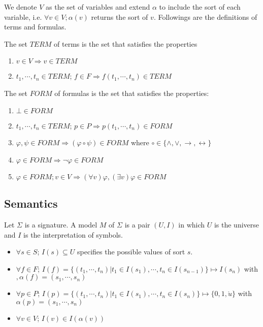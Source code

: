We denote $V$ as the set of variables and extend $\alpha$ to include the sort of each variable, i.e. $\forall v \in V; \alpha(v)$ returns the sort of $v$. Followings are the definitions of terms and formulas.

\begin{definition}
The set $TERM$ of terms is the set that satisfies the properties
\begin{enumerate}
\item $v \in V \Rightarrow v \in TERM$
\item $t_1,\cdots,t_n \in TERM$; $f \in F \Rightarrow f(t_1,\cdots, t_n) \in TERM$
\end{enumerate}
\end{definition}

\begin{definition}
The set $FORM$ of formulas is the set that satisfies the properties:
\begin{enumerate}
\item $\bot \in FORM$
\item $t_1,\cdots,t_n \in TERM$; $p \in P \Rightarrow p(t_1,\cdots, t_n) \in FORM$
\item $\varphi, \psi \in FORM \Rightarrow (\varphi \circ \psi) \in FORM$ where $\circ \in \{\wedge, \vee, \rightarrow, \leftrightarrow\}$
\item $\varphi \in FORM \Rightarrow \neg\varphi \in FORM$
\item $\varphi \in FORM; v \in V \Rightarrow (\forall v)\varphi, (\exists v)\varphi \in FORM$
\end{enumerate}
\end{definition}

\subsection{Semantics}

\begin{definition}
Let $\Sigma$ is a signature. A model $M$ of $\Sigma$ is a pair $(U, I)$ in which $U$ is the universe and $I$ is the interpretation of symbols.
\begin{itemize}
\item $\forall s \in S$; $I(s) \subseteq U$ specifies the possible values of sort $s$.
\item $\forall f \in F$; $I(f) = \{(t_1,\cdots, t_n)| t_1 \in I(s_1),\cdots, t_n \in I(s_{n-1})\} \mapsto I(s_n)$ with $, \alpha(f) = (s_1,\cdots, s_n)$
\item $\forall p \in P$; $I(p) = \{(t_1,\cdots, t_n)| t_1 \in I(s_1),\cdots, t_n \in I(s_n)\} \mapsto \{0, 1, \mathring{u}\}$ with $\alpha(p) = (s_1,\cdots, s_n)$
\item $\forall v \in V$; $I(v) \in I(\alpha(v))$
\end{itemize}
\end{definition}

